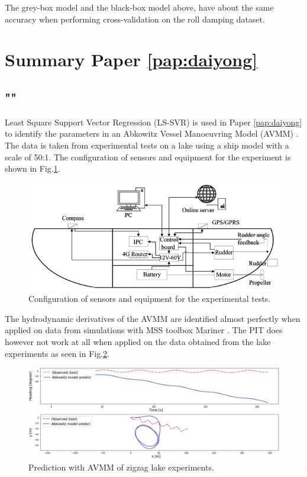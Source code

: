 \noindent The grey-box model and the black-box model above, have about the same accuracy when performing cross-validation on the roll damping dataset.

\section{Summary Paper \ref{pap:daiyong}}
\subsection*{""}
Least Square Support Vector Regression (LS-SVR) \cite{brereton_support_2010} is used in Paper \ref{pap:daiyong} to identify the parameters in an Abkowitz Vessel Manoeuvring Model (AVMM) \cite{abkowitz_ship_1964}.  
The data is taken from experimental tests on a lake using a ship model with a scale of 50:1. The configuration of sensors and equipment for the experiment is shown in Fig.\ref{fig:cthmodel}.  
\begin{figure}[H]
    \centering
    \includegraphics[width=\textwidth]{kappa/images/cth_model.png}
    \caption{Configuration of sensors and equipment for the experimental tests.}
    \label{fig:cthmodel}
\end{figure}
\noindent The hydrodynamic derivatives of the AVMM are identified almost perfectly when applied on data from simulations with MSS toolbox Mariner \cite{tristan_matlab_2009}. The PIT does however not work at all when applied on the data obtained from the lake experiments as seen in Fig.\ref{fig:daiyong_extrapolation}. 

\begin{figure}[H]
    \centering
    \includegraphics[width=\linewidth]{kappa/images/daiyong_extrapolation.jpeg}
    \caption{Prediction with AVMM of zigzag lake experiments.}
    \label{fig:daiyong_extrapolation}
\end{figure}

